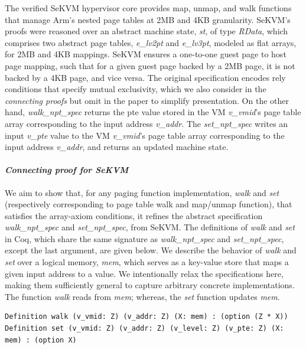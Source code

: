 The verified SeKVM hypervisor core provides map, unmap, and walk functions that manage Arm's nested page tables at 2MB and 4KB granularity. SeKVM's proofs were reasoned over an abstract machine state, \textit{st}, of type \textit{RData}, which comprises two abstract page tables, \textit{e\_lv2pt} and \textit{e\_lv3pt}, modeled as flat arrays, for 2MB and 4KB mappings. SeKVM ensures a one-to-one guest page to host page mapping, such that for a given guest page backed by a 2MB page, it is not backed by a 4KB page, and vice versa. The original specification encodes rely conditions that specify mutual exclusivity, which we also consider in the \textit{connecting proofs} but omit in the paper to simplify presentation. On the other hand, \textit{walk\_npt\_spec} returns the pte value stored in the VM \textit{v\_vmid}'s page table array corresponding to the input address \textit{v\_addr}. The \textit{set\_npt\_spec} writes an input \textit{v\_pte} value to the VM \textit{v\_vmid}'s page table array corresponding to the input address \textit{v\_addr}, and returns an updated machine state.

\paragraph{\textit{Connecting proof for SeKVM}} We aim to show that, for any paging function implementation, \textit{walk} and \textit{set} (respectively corresponding to page table walk and map/unmap function), that satisfies the array-axiom conditions, it refines the abstract specification \textit{walk\_npt\_spec} and \textit{set\_npt\_spec}, from SeKVM.
The definitions of \textit{walk} and \textit{set} in Coq, which share the same signature as \textit{walk\_npt\_spec} and \textit{set\_npt\_spec}, except the last argument, are given below. We describe the behavior of \textit{walk} and \textit{set} over a logical memory, \emph{mem}, which serves as a key-value store that maps a given input address to a value. We intentionally relax the specifications here, making them sufficiently general to capture arbitrary concrete implementations. The function \emph{walk} reads from \emph{mem}; whereas, the \emph{set} function updates \emph{mem}.


\begin{lstlisting}[style=coq]
Definition walk (v_vmid: Z) (v_addr: Z) (X: mem) : (option (Z * X))
Definition set (v_vmid: Z) (v_addr: Z) (v_level: Z) (v_pte: Z) (X: mem) : (option X)
\end{lstlisting}


